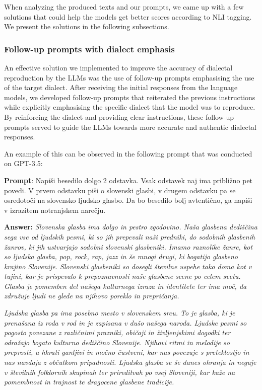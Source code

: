\documentclass[fleqn,moreauthors,10pt]{ds_report}
\begin{document}
    When analyzing the produced texts and our prompts, we came up with a few solutions that could help the models get better scores according to NLI tagging. We present the solutions in the following subsections.

\subsubsection{Follow-up prompts with dialect emphasis}

    An effective solution we implemented to improve the accuracy of dialectal reproduction by the LLMs was the use of follow-up prompts emphasising the use of the target dialect. After receiving the initial responses from the language models, we developed follow-up prompts that reiterated the previous instructions while explicitly emphasising the specific dialect that the model was to reproduce. By reinforcing the dialect and providing clear instructions, these follow-up prompts served to guide the LLMs towards more accurate and authentic dialectal responses.

\vspace{\baselineskip}
An example of this can be observed in the following prompt that was conducted on GPT-3.5:

\vspace{\baselineskip}
\textbf{Prompt}: 
Napiši besedilo dolgo 2 odstavka. Vsak odstavek naj ima približno pet povedi. V prvem odstavku piši o slovenski glasbi, v drugem odstavku pa se osredotoči na slovensko ljudsko glasbo. Da bo besedilo bolj avtentično, ga napiši v izrazitem notranjskem narečju.

\textbf{Answer:}
\textit{Slovenska glasba ima dolgo in pestro zgodovino. Naša glasbena dediščina sega vse od ljudskih pesmi, ki so jih prepevali naši predniki, do sodobnih glasbenih žanrov, ki jih ustvarjajo sodobni slovenski glasbeniki. Imamo raznolike žanre, kot so ljudska glasba, pop, rock, rap, jazz in še mnogi drugi, ki bogatijo glasbeno krajino Slovenije. Slovenski glasbeniki so dosegli številne uspehe tako doma kot v tujini, kar je prispevalo k prepoznavnosti naše glasbene scene po celem svetu. Glasba je pomemben del našega kulturnega izraza in identitete ter ima moč, da združuje ljudi ne glede na njihovo poreklo in prepričanja.}

\textit{Ljudska glasba pa ima posebno mesto v slovenskem srcu. To je glasba, ki je prenašana iz roda v rod in je zapisana v dušo našega naroda. Ljudske pesmi so pogosto povezane z različnimi prazniki, običaji in življenjskimi dogodki ter odražajo bogato kulturno dediščino Slovenije. Njihovi ritmi in melodije so preprosti, a hkrati ganljivi in močno čustveni, kar nas povezuje s preteklostjo in nas navdaja z občutkom pripadnosti. Ljudska glasba se še danes ohranja in neguje v številnih folklornih skupinah ter prireditvah po vsej Sloveniji, kar kaže na pomembnost in trajnost te dragocene glasbene tradicije.}
\end{document}
